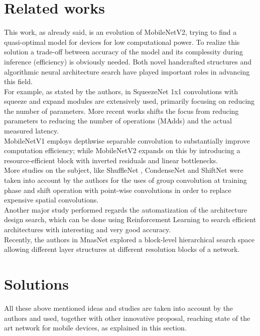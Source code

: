 \documentclass[12pt, letterpaper, twoside]{article}
\begin{document}
\section{Related works}
This work, as already said, is an evolution of MobileNetV2, trying to find a quasi-optimal model for devices for low computational power. To realize this solution a trade-off between accuracy of the model and its complessity during inference (efficiency) is obviously needed. Both novel handcrafted structures and algorithmic neural architecture search have played important roles in advancing this field.\\

For example, as stated by the authors, in SqueezeNet \cite{iandola2016squeezenet} 1x1 convolutions with squeeze and expand modules are extensively used, primarily focusing on reducing the number of parameters. More recent works shifts the focus from reducing parameters to reducing the number of operations (MAdds) and the actual measured latency. \\ 
MobileNetV1 \cite{howard2017mobilenets} employs depthwise separable convolution to substantially improve computation efficiency; while MobileNetV2 \cite{sandler2019mobilenetv2} expands on this by introducing a resource-efficient block with inverted residuals and linear bottlenecks. \\
More studies on the subject, like ShuffleNet \cite{zhang2017shufflenet}, CondenseNet \cite{huang2018condensenet} and ShiftNet \cite{yan2018shiftnet} were taken into account by the authors for the uses of group convolution at training phase and shift operation with point-wise convolutions in order to replace expensive spatial convolutions. \\

Another major study performed regards the automatization of the architecture design search, which can be done using Reinforcement Learning to search efficient architectures with interesting and very good accuracy.\\
Recently, the authors in MnasNet \cite{tan2019mnasnet} explored a block-level hierarchical search space allowing different layer structures at different resolution blocks of a network.\\

\clearpage
\section{Solutions}
All these above mentioned ideas and studies are taken into account by the authors and used, together with other innovative proposal, reaching state of the art network for mobile devices, as explained in this section.
\end{document}
